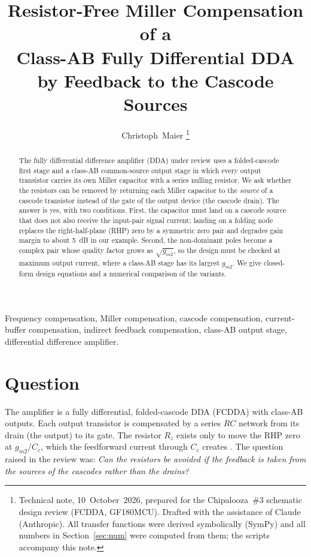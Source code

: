 \documentclass[journal]{IEEEtran}
\newcommand{\gmt}{g_{m2}}
\begin{document}
\title{Resistor-Free Miller Compensation of a\\Class-AB Fully Differential DDA\\by Feedback to the Cascode Sources}

\author{Christoph~Maier%
\thanks{Technical note, 10~October~2026, prepared for the Chipalooza~\#3 schematic design review (FCDDA, GF180MCU). Drafted with the assistance of Claude (Anthropic). All transfer functions were derived symbolically (SymPy) and all numbers in Section~\ref{sec:num} were computed from them; the scripts accompany this note.}}


\maketitle

\begin{abstract}
The fully differential difference amplifier (DDA) under review uses a folded-cascode first stage and a class-AB common-source output stage in which every output transistor carries its own Miller capacitor with a series nulling resistor. We ask whether the resistors can be removed by returning each Miller capacitor to the \emph{source} of a cascode transistor instead of the gate of the output device (the cascode drain). The answer is yes, with two conditions. First, the capacitor must land on a cascode source that does not also receive the input-pair signal current; landing on a folding node replaces the right-half-plane (RHP) zero by a symmetric zero pair and degrades gain margin to about \SI{5}{dB} in our example. Second, the non-dominant poles become a complex pair whose quality factor grows as $\sqrt{\gmt}$, so the design must be checked at maximum output current, where a class-AB stage has its largest $\gmt$. We give closed-form design equations and a numerical comparison of the variants.
\end{abstract}

\begin{IEEEkeywords}
Frequency compensation, Miller compensation, cascode compensation, current-buffer compensation, indirect feedback compensation, class-AB output stage, differential difference amplifier.
\end{IEEEkeywords}

\section{Question}
The amplifier is a fully differential, folded-cascode DDA \cite{sackinger1987} (FCDDA) with class-AB outputs. Each output transistor is compensated by a series $RC$ network from its drain (the output) to its gate. The resistor $R_z$ exists only to move the RHP zero at $\gmt/C_c$, which the feedforward current through $C_c$ creates \cite{palmisano1995}. The question raised in the review was:
\emph{Can the resistors be avoided if the feedback is taken from the sources of the cascodes rather than the drains?}
\end{document}
